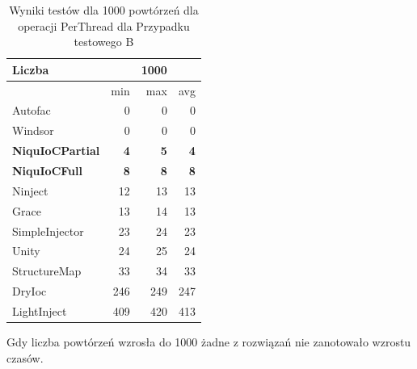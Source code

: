 \documentclass[12pt]{article}
\begin{document}
\begin{table}[H]
\captionsetup{belowskip=0pt,aboveskip=0pt}
\begin{center}
\begin{small}
	\begin{tabular}{ | l | r r r | }
    		\hline
Liczba & & 1000 & \\ \hline
 & min & max & avg \\ \hline
Autofac & 0 & 0 & 0 \\ \hline
Windsor & 0 & 0 & 0 \\ \hline
\textbf{NiquIoCPartial} & \textbf{4} & \textbf{5} & \textbf{4} \\ \hline
\textbf{NiquIoCFull} & \textbf{8} & \textbf{8} & \textbf{8} \\ \hline
Ninject & 12 & 13 & 13 \\ \hline
Grace & 13 & 14 & 13 \\ \hline
SimpleInjector & 23 & 24 & 23 \\ \hline
Unity & 24 & 25 & 24 \\ \hline
StructureMap & 33 & 34 & 33 \\ \hline
DryIoc & 246 & 249 & 247 \\ \hline
LightInject & 409 & 420 & 413 \\ \hline
  	\end{tabular}
\end{small}
\end{center}
\caption{Wyniki testów dla 1000 powtórzeń dla operacji PerThread dla Przypadku testowego B}
\label{TestCaseB_PerThread1000}
\end{table}
Gdy liczba powtórzeń wzrosła do 1000 żadne z rozwiązań nie zanotowało wzrostu czasów.
\end{document}
